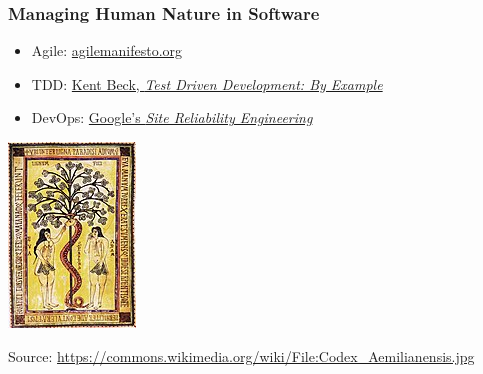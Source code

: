\begin{frame}
\frametitle{Managing Human Nature in Software}
\begin{itemize}
\item Agile: \href{https://agilemanifesto.org/}{agilemanifesto.org}
\item TDD: \href{https://www.oreilly.com/library/view/test-driven-development/0321146530/}{Kent Beck, {\it Test Driven Development: By Example}}
\item DevOps: \href{https://landing.google.com/sre/books/}{Google's {\it Site Reliability Engineering}}
\end{itemize}
\begin{center}
\includegraphics[height=0.35\textheight]{graphics/Codex_Aemilianensis}
\end{center}
Source: \url{https://commons.wikimedia.org/wiki/File:Codex_Aemilianensis.jpg}
\end{frame}


